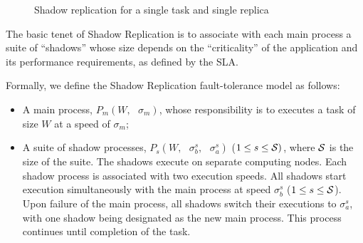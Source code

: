 \begin{figure}[!t]
	\begin{center}
	\end{center}
	\caption{Shadow replication for a single task and single replica}
	\label{fig:sc_overview}
\end{figure}

\noindent 
The basic tenet of Shadow Replication is to associate with each
main process a suite of ``shadows'' whose size depends on the
``criticality'' of the application and its performance requirements,
as defined by the SLA. 

Formally, we define the Shadow Replication fault-tolerance model as follows:
\begin{itemize}
\item A main process, $P_m(W,\text{ }\sigma_m)$, whose responsibility is to executes a task of size $W$ at a speed of $\sigma_m$;
\item A suite of shadow processes, $P_{s}(W,\text{ }\sigma_b^s, \text{ }\sigma_a^s)$ ($1 \le s \le \cal S)$, where $\cal S$ is the size of the suite. 
The shadows execute on separate computing nodes. Each shadow process is associated with two execution speeds. All shadows start execution simultaneously with the main process at speed $\sigma_b^s$ ($1 \le s \le \cal S$). Upon failure of the main process, all shadows switch their executions to $\sigma_a^s$, with one shadow being designated as the new main process. This process continues until completion of the task.
\end{itemize}

